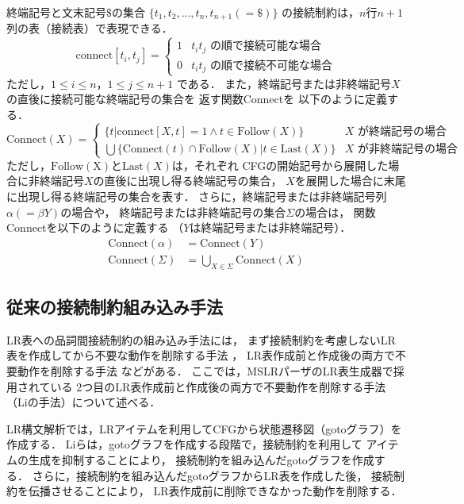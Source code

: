 \documentclass[japanese]{jnlp_1.4}
\begin{document}
終端記号と文末記号$\$$の集合 $\{t_1,t_2,\dots ,t_n,t_{n+1}(=\$)\}$
の接続制約は，$n$行$n+1$列の表（接続表）で表現できる．
\[
  \mathrm{connect}[t_i,t_j]=
  \begin{cases}
    1 & \text{$t_it_j$ の順で接続可能な場合} \\
    0 & \text{$t_it_j$ の順で接続不可能な場合}
  \end{cases}
\]
ただし，$1\leq i\leq n$，$1\leq j\leq n+1$ である．
また，終端記号または非終端記号$X$の直後に接続可能な終端記号の集合を
返す関数Connectを
\pagebreak
以下のように定義する．
\[
  \mathrm{Connect}(X)=
  \begin{cases}
    \{t|\mathrm{connect}[X,t]=1 \wedge t\in\mathrm{Follow}(X)\}
    & \text{$X$ が終端記号の場合}\\
    \bigcup\{\mathrm{Connect}(t)\cap\mathrm{Follow}(X)|t\in\mathrm{Last}(X)\}
    & \text{$X$ が非終端記号の場合}
  \end{cases}
\]
ただし，$\mathrm{Follow(X)}$と$\mathrm{Last}(X)$は，それぞれ
CFGの開始記号から展開した場合に非終端記号$X$の直後に出現し得る終端記号の集合，
$X$を展開した場合に末尾に出現し得る終端記号の集合を表す．
さらに，終端記号または非終端記号列$\alpha (=\beta Y)$の場合や，
終端記号または非終端記号の集合$\Sigma$の場合は，
関数Connectを以下のように定義する
（$Y$は終端記号または非終端記号）．
\begin{align*}
  \mathrm{Connect}(\alpha)&=\mathrm{Connect}(Y)\\
  \mathrm{Connect}(\Sigma)&=\bigcup_{X\in \Sigma}\mathrm{Connect}(X)
\end{align*}


\subsection{従来の接続制約組み込み手法}

LR表への品詞間接続制約の組み込み手法には，
まず接続制約を考慮しないLR表を作成してから不要な動作を削除する手法
\cite{tanaka:95}，
LR表作成前と作成後の両方で不要動作を削除する手法
\cite{li:95}などがある．
ここでは，MSLRパーザのLR表生成器で採用されている
2つ目のLR表作成前と作成後の両方で不要動作を削除する手法（Liの手法）について述べる．

LR構文解析では，LRアイテムを利用してCFGから状態遷移図（gotoグラフ）を作成する．
Liらは，gotoグラフを作成する段階で，接続制約を利用して
アイテムの生成を抑制することにより，
接続制約を組み込んだgotoグラフを作成する．
さらに，接続制約を組み込んだgotoグラフからLR表を作成した後，
接続制約を伝播させることにより，
LR表作成前に削除できなかった動作を削除する．
\end{document}

